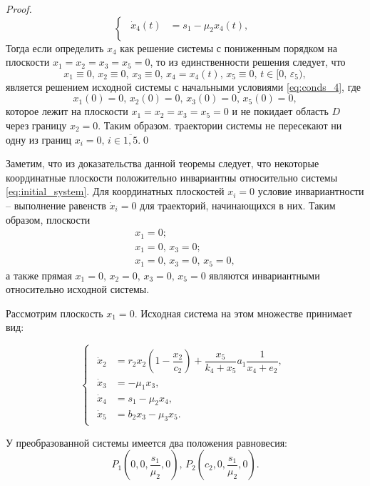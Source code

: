 \documentclass[14pt,a4paper]{extarticle}
\begin{document}
\begin{proof}
\begin{equation*}
\begin{cases}
				\begin{aligned}
					\dot{x}_4(t) &= s_1-\mu_2x_4(t),\\
				\end{aligned}
			\end{cases}
		\end{equation*} 
		Тогда если определить $x_4$ как решение системы с пониженным порядком на плоскости $x_1=x_2=x_3=x_5=0$, то из единственности решения следует, что
		\[x_1\equiv0,\, x_2\equiv0,\, x_3\equiv0,\, x_4=x_4(t),\, x_5\equiv0,\, t\in[0,\,\varepsilon_5),\]
		является решением исходной системы с начальными условиями \ref{eq:conds_4}, где
		\[x_1(0)=0,\, x_2(0)=0,\, x_3(0)=0,\, x_5(0)=0,\]
		которое лежит на плоскости $x_1=x_2=x_3=x_5=0$ и не покидает область $D$ через границу $x_2=0$. Таким образом. траектории системы не пересекают ни одну из границ $x_i=0,\, i\in\overline{1,5}$.\qed
	\end{proof}
	
	Заметим, что из доказательства данной теоремы следует, что некоторые координатные плоскости положительно инвариантны относительно системы \ref{eq:initial_system}. Для координатных плоскостей $x_i=0$ условие инвариантности -- выполнение равенств $\dot{x}_i=0$ для траекторий, начинающихся в них. Таким образом, плоскости  
	\begin{gather*}
		x_1=0;\\
		x_1=0,\, x_3=0;\\
		x_1=0,\, x_3=0,\, x_5=0,
	\end{gather*}
	а также прямая $x_1=0,\, x_2=0,\, x_3=0,\, x_5=0$ являются инвариантными относительно исходной системы.  
	
	Рассмотрим плоскость $x_1=0$. Исходная система на этом множестве принимает вид:
	
	\begin{equation*}
		\begin{cases}
			\begin{aligned}
				\dot{x}_2 &= r_2x_2\left(1-\dfrac{x_2}{c_2}\right)+\dfrac{x_5}{k_4+x_5}a_1\dfrac{1}{x_4+e_2},\\
				\dot{x}_3 &= -\mu_1x_3,\\
				\dot{x}_4 &= s_1 - \mu_2x_4,\\
				\dot{x}_5 &= b_2x_3-\mu_3x_5.
			\end{aligned}
		\end{cases}
	\end{equation*}
	
	У преобразованной системы имеется два положения равновесия:
	\[P_1\left(0,0,\frac{s_1}{\mu_2},0\right),\, P_2\left(c_2,0,\frac{s_1}{\mu_2},0\right).\]
	
\end{document}
